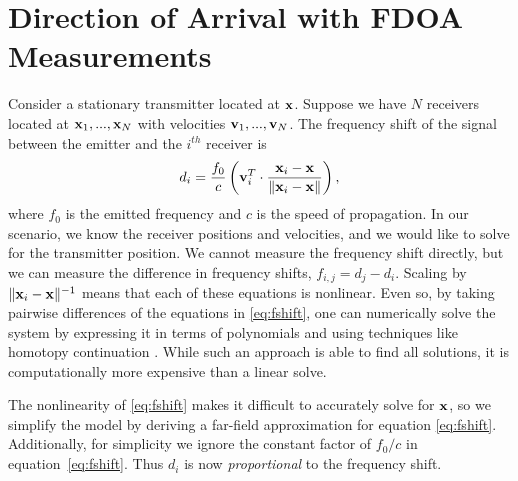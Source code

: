 \section{Direction of Arrival with FDOA Measurements}
\label{s:FDOA}

Consider a stationary transmitter located at $\mathbf{x}$. Suppose we have $N$ receivers located at $\mathbf{x}_1, ...,\mathbf{x}_N$ with velocities $\mathbf{v}_1, ...,\mathbf{v}_N$. The frequency shift of the signal between the emitter and the $i^{th}$ receiver is
\begin{align}
  \label{eq:fshift}
  d_i =  \frac{f_0}{c}\left(\mathbf{v}_i^T\cdot\frac{\mathbf{x}_i-\mathbf{x}}{\|\mathbf{x}_i-\mathbf{x}\|}\right),
\end{align}
where $f_0$ is the emitted frequency and $c$ is the speed of propagation. In our scenario, we know the receiver positions and velocities, and we would like to solve for the transmitter position. We cannot measure the frequency shift directly, but we can measure the difference in frequency shifts,
$f_{i,j} = d_j-d_i$. Scaling by $\|\mathbf{x}_i-\mathbf{x}\|^{-1}$ means that each of these equations is nonlinear. Even so, by taking pairwise differences of the equations in \eqref{eq:fshift}, one can numerically solve the system by expressing it in terms of polynomials and using techniques like homotopy continuation \cite{Cameron}. While such an approach is able to find all solutions, it is computationally more expensive than a linear solve.

The nonlinearity of \ref{eq:fshift} makes it difficult to accurately solve for $\mathbf{x}$, so we simplify the model by deriving a far-field approximation for equation \ref{eq:fshift}. Additionally, for simplicity we ignore the constant factor of $f_0/c$ in equation~\ref{eq:fshift}. Thus $d_i$ is now \textit{proportional} to the frequency shift.

